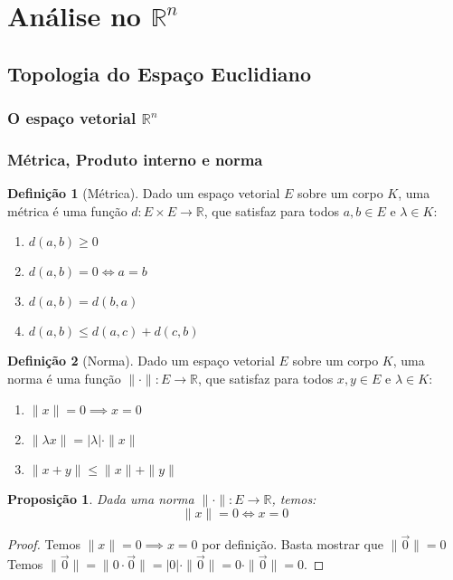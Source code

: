 \documentclass{article}
\newtheorem{prop}{Proposição}[section]
\theoremstyle{theorem}
\theoremstyle{lemma}
\theoremstyle{definition}
\newtheorem{definicao}{Definição}[section]
\theoremstyle{remark}
\begin{document}
\section{Análise no $\mathbb{R}^n$}
\subsection{ Topologia do Espaço Euclidiano}
   \subsubsection{O espaço vetorial $\mathbb{R}^n$}
   \subsubsection{Métrica, Produto interno e norma}
\begin{definicao}[Métrica]
	Dado um espaço vetorial $E$ sobre um corpo $K$, uma métrica é uma função $d: E\times E \to \mathbb{R}$, que satisfaz para todos $a,b\in E$ e $\lambda \in K$:
	\begin{enumerate}
		\item $d(a,b) \geq 0$
		\item $d(a,b) = 0 \iff a = b $
		\item $d(a,b) = d(b,a)$
		\item $ d(a,b) \leq d(a,c) + d(c,b)$
	\end{enumerate}
\end{definicao}
\begin{definicao}[Norma]
	Dado um espaço vetorial $E$ sobre um corpo $K$, uma norma é uma função $\| \cdot \|: E \to \mathbb{R}$, que satisfaz para todos $x,y\in E$ e $\lambda \in K$:

	\begin{enumerate}
		\item $\| x \| = 0 \implies x = 0 $
		\item $\| \lambda x \| = | \lambda | \cdot \| x \|$
		\item $ \| x+y \| \leq \| x \| + \| y \|$
	\end{enumerate}
\end{definicao}
\begin{prop}
	Dada uma norma $\| \cdot \|: E \to \mathbb{R}$, temos:
	$$ \| x\| = 0 \iff x = 0 $$
\end{prop}
\begin{proof}
	Temos $\| x \| =0 \implies x = 0$ por definição. Basta mostrar que $\| \vec{0} \| = 0 $
	Temos $\| \vec{0} \| = \| 0 \cdot \vec{0} \|  = |0| \cdot \| \vec{0} \| = 0 \cdot \|\vec{0} \| = 0$.
\end{proof}
\end{document}
